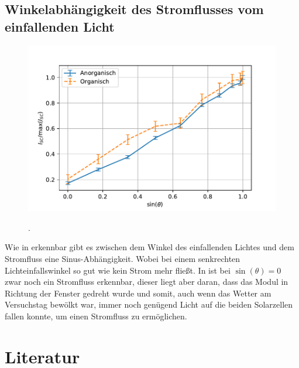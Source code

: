 \documentclass[slug=SZ, room=Hermann-Krone-Bau\,\ Labor\ 1.25, supervisor=Martin\ Kroll]{../../Lab_Report_LaTeX/lab_report}
\begin{document}
\subsection{Winkelabhängigkeit des Stromflusses vom einfallenden Licht}
\label{sec:winkel}

\begin{figure}[H]\centering\label{fig:winkel}
	\includegraphics[width=.5\columnwidth]{figs/python/E/relativ.pdf}
	\caption[.]{.}
\end{figure}

Wie in  erkennbar gibt es zwischen dem Winkel des einfallenden
Lichtes und dem Stromfluss eine Sinus-Abhängigkeit. Wobei bei einem senkrechten 
Lichteinfallswinkel so gut wie kein Strom mehr fließt.
In  ist bei \(\sin(\theta) = 0\) zwar noch ein Stromfluss erkennbar,
dieser liegt aber daran, dass das Modul in Richtung der Fenster gedreht wurde und somit,
auch wenn das Wetter am Versuchstag bewölkt war, immer noch genügend Licht auf die beiden
Solarzellen fallen konnte, um einen Stromfluss zu ermöglichen.

\section{Literatur}
\label{sec:literatur}

\printbibliography
\end{document}
